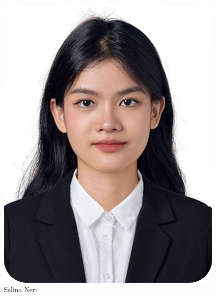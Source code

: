 \begin{figure}[h!]
\begin{minipage}{0.12\linewidth}
		\includegraphics[width=\linewidth]{images/Selina}
		\caption*{Selina Neri}
	\end{minipage}
	\hfill
	\begin{minipage}{0.12\linewidth}
		\centering

\end{minipage}
\end{figure}
